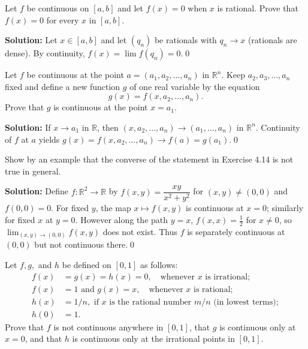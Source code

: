 \begin{problembox}
Let \( f \) be continuous on \([a, b]\) and let \( f(x) = 0 \) when \( x \) is rational. Prove that \( f(x) = 0 \) for every \( x \) in \([a, b]\).
\end{problembox}

\noindent\textbf{Solution:}
Let $x\in[a,b]$ and let $(q_n)$ be rationals with $q_n\to x$ (rationals are dense). By continuity, $f(x)=\lim f(q_n)=0$.\qed



\begin{problembox}
Let \( f \) be continuous at the point \( a = (a_1, a_2, \ldots, a_n) \) in \( \mathbb{R}^n \). Keep \( a_2, a_3, \ldots, a_n \) fixed and define a new function \( g \) of one real variable by the equation
\[g(x) = f(x, a_2, \ldots, a_n).\]
Prove that \( g \) is continuous at the point \( x = a_1 \).
\end{problembox}

\noindent\textbf{Solution:}
If $x\to a_1$ in $\mathbb{R}$, then $(x,a_2,\ldots,a_n)\to(a_1,\ldots,a_n)$ in $\mathbb{R}^n$. Continuity of $f$ at $a$ yields $g(x)=f(x,a_2,\ldots,a_n)\to f(a)=g(a_1)$.\qed



\begin{problembox}
Show by an example that the converse of the statement in Exercise 4.14 is not true in general.
\end{problembox}

\noindent\textbf{Solution:}
Define $f:\mathbb{R}^2\to\mathbb{R}$ by $f(x,y)=\dfrac{xy}{x^2+y^2}$ for $(x,y)\ne(0,0)$ and $f(0,0)=0$. For fixed $y$, the map $x\mapsto f(x,y)$ is continuous at $x=0$; similarly for fixed $x$ at $y=0$. However along the path $y=x$, $f(x,x)=\tfrac{1}{2}$ for $x\ne0$, so $\lim_{(x,y)\to(0,0)}f(x,y)$ does not exist. Thus $f$ is separately continuous at $(0,0)$ but not continuous there.\qed



\begin{problembox}
Let \( f, g, \) and \( h \) be defined on \([0, 1]\) as follows:
\begin{align*}
f(x) &= g(x) = h(x) = 0, \quad \text{whenever } x \text{ is irrational}; \\
f(x) &= 1 \text{ and } g(x) = x, \quad \text{whenever } x \text{ is rational}; \\
h(x) &= 1/n, \text{ if } x \text{ is the rational number } m/n \text{ (in lowest terms)}; \\
h(0) &= 1.
\end{align*}
Prove that \( f \) is not continuous anywhere in \([0, 1]\), that \( g \) is continuous only at \( x = 0 \), and that \( h \) is continuous only at the irrational points in \([0, 1]\).
\end{problembox}

